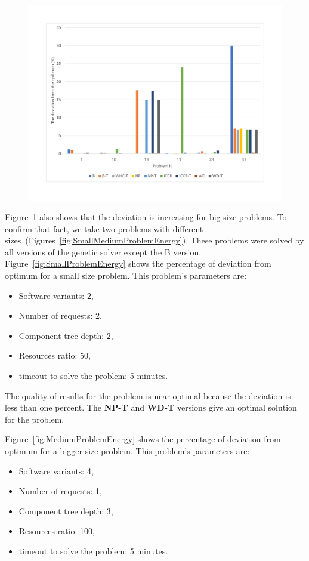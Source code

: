 \begin{figure}
	\centering
	\includegraphics[width=\textwidth]{images/EnergyPercentage.pdf}
	\caption[]{}
	\label{fig:EnergyPercentage}
\end{figure}

Figure~\ref{fig:EnergyPercentage} also shows that the deviation is increasing for big size problems. To confirm that fact, we take two problems with different sizes~(Figures~\ref{fig:SmallMediumProblemEnergy}). These problems were solved by all versions of the genetic solver except the B version. Figure~\ref{fig:SmallProblemEnergy} shows the percentage of deviation from optimum for a small size problem. This problem's parameters are:
\begin{itemize}
	\item Software variants: 2,
	\item Number of requests: 2,
	\item Component tree depth: 2,
	\item Resources ratio: 50,
	\item timeout to solve the problem: 5 minutes.
\end{itemize}

The quality of results for the problem is near-optimal because the deviation is less than one percent. The \textbf{NP-T} and \textbf{WD-T} versions give an optimal solution for the problem.

Figure~\ref{fig:MediumProblemEnergy} shows the percentage of deviation from optimum for a bigger size problem. This problem's parameters are:
\begin{itemize}
	\item Software variants: 4,
	\item Number of requests: 1,
	\item Component tree depth: 3,
	\item Resources ratio: 100,
	\item timeout to solve the problem: 5 minutes.
\end{itemize}


